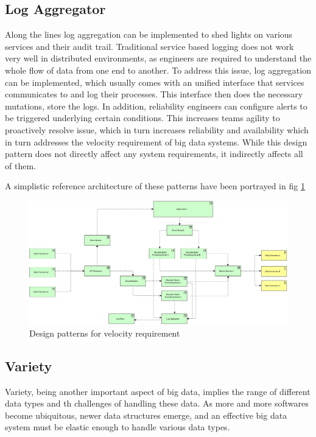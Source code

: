 \documentclass[conference]{IEEEtran}
\begin{document}
\subsection{Log Aggregator}

Along the lines log aggregation can be implemented to shed lights on various services and their audit trail. Traditional service based logging does not work very well in distributed environments, as engineers are required to understand the whole flow of data from one end to another. To address this issue, log aggregation can be implemented, which usually comes with an unified interface that services communicates to and log their processes. This interface then does the necessary mutations, store the logs. In addition, reliability engineers can configure alerts to be triggered underlying certain conditions. This increases teams agility to proactively resolve issue, which in turn increases reliability and availability which in turn addresses the velocity requirement of big data systems. While this design pattern does not directly affect any system requirements, it indirectly affects all of them.


A simplistic reference architecture of these patterns have been portrayed in fig \ref{fig-vel-ra}


\begin{figure}[h!]
    \includegraphics[width=17cm]{../Media/Velocity Requirement.jpg}
    \caption{Design patterns for velocity requirement}
    \label{fig-vel-ra}
\end{figure}


\subsection{Variety}

Variety, being another important aspect of big data, implies the range of different data types and th challenges of handling these data. As more and more softwares become ubiquitous, newer data structures emerge, and an effective big data system must be elastic enough to handle various data types. 
\end{document}
